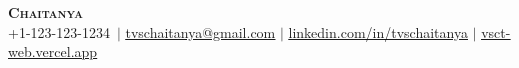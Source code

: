 \newcommand{\MyName}{Chaitanya}
\newcommand{\MyPhone}{+1-123-123-1234}
\newcommand{\MyEmail}{tvschaitanya@gmail.com}
\newcommand{\MyLinkedIn}{linkedin.com/in/tvschaitanya}
\newcommand{\MyGitHub}{github.com/tvschaitanya}
\newcommand{\MyPortfolio}{vsct-web.vercel.app}

\begin{center}
    \textbf{\Huge \scshape \MyName} \\ \vspace{1pt}
    \small \MyPhone\ $|$ 
    \href{mailto:\MyEmail}{\underline{\MyEmail}} $|$ 
    \href{https://\MyLinkedIn}{\underline{\MyLinkedIn}} $|$
    \href{https://\MyPortfolio}{\underline{\MyPortfolio}}
\end{center}
